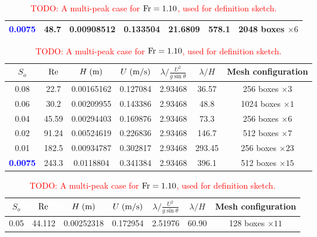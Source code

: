 \documentclass[a4paper]{article}
\newcommand{\fr}{{\rm{Fr}}}
\newcommand{\sa}{\sin\theta}
\begin{document}
\begin{table}[htbp]
\begin{subtable}{1\textwidth}
\begin{tabular}{ccccccc}
			\textcolor{blue}{\bf 0.0075} & 48.7 & 0.00908512 & 0.133504 & 21.6809 & 578.1 & 2048 boxes $\times 6$\\
			
			\bottomrule 
		\end{tabular}
		\caption{Simulation parameters for $\fr=0.447$.}
		\label{params_0447}
	\end{subtable}
	
	\vspace{0.25cm}
	
	\begin{subtable}{1\textwidth}
		\centering
		\begin{tabular}{ccccccc}
			$S_o$ & $\rm Re$ & $H\;{\rm (m)}$ & $U\;{\rm (m/s)}$ & $\lambda/\frac{U^2}{g\sa}$ & $\lambda/H$ & Mesh configuration\\
			\toprule
			0.08 & 22.7 & 0.00165162 & 0.127084 & 2.93468 & 36.57 & 256 boxes $\times 3$\\
			
			0.06 & 30.2 & 0.00209955 & 0.143386 & 2.93468 & 48.8 & 1024 boxes $\times 1$\\
			
			0.04 & 45.59 & 0.00294403 & 0.169876 & 2.93468 & 73.3 & 256 boxes $\times 6$\\
			
			0.02 & 91.24 & 0.00524619 & 0.226836 & 2.93468 & 146.7 & 512 boxes $\times 7$\\
			
			0.01 & 182.5 & 0.00934787 & 0.302817 & 2.93468 & 293.45 & 256 boxes $\times 23$\\
			
			\textcolor{blue}{\bf 0.0075} & 243.3 & 0.0118804 & 0.341384 & 2.93468 & 396.1 & 512 boxes $\times 15$\\
			\bottomrule 
		\end{tabular}
		\caption{Simulation parameters for $\fr=1.00$.}
		\label{params_1}
	\end{subtable}

	\vspace{0.25cm}
	
	\begin{subtable}{1\textwidth}
		\centering
		\begin{tabular}{ccccccc}
			$S_o$ & $\rm Re$ & $H\;{\rm (m)}$ & $U\;{\rm (m/s)}$ & $\lambda/\frac{U^2}{g\sa}$ & $\lambda/H$ & Mesh configuration\\
			\toprule
			0.05 & 44.112 & 0.00252318 & 0.172954 & 2.51976 & 60.90 & 128 boxes $\times 11$\\
			\bottomrule 
		\end{tabular}
		\caption{\textcolor{red}{TODO: A multi-peak case for $\fr=1.10$, used for definition sketch.}}
		\label{params_110}
	\end{subtable}


\end{table}
\end{document}
